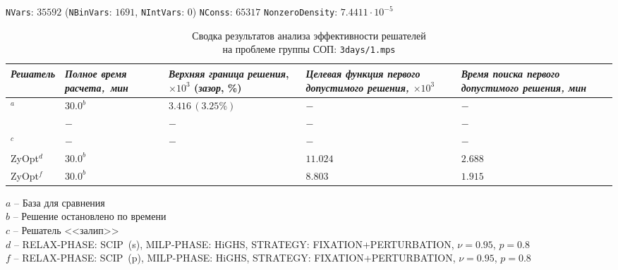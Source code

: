 \documentclass[%
	11pt,
	a4paper,
	utf8,
		]{article}
\begin{document}
\vspace*{5mm}

{
	\begin{table}[!h]
		\centering
		\caption{Сводка результатов анализа эффективности решателей\\ на проблеме группы СОП: \texttt{3days/1.mps}} 
		
		{\footnotesize \texttt{NVars}: $ 35592 $ (\texttt{NBinVars}: $ 1691 $,  \texttt{NIntVars}: $ 0 $) \texttt{NConss}: $ 65317 $ \texttt{NonzeroDensity}: $  7.4411 \cdot 10^{-5} $}\\[2mm]
		
		\begin{tabular}{ p{2.9cm} | p{2.5cm} p{3.6cm} p{3.75cm} p{3.6cm} p{3.2cm} }
			\rowcolor{black!5}\emph{Решатель} & \emph{Полное время \mbox{расчета, мин}} & \emph{Верхняя граница} \mbox{\itshape решения}, $ \times 10^{3} $ (\emph{зазор}, \%) & \emph{Целевая функция первого допустимого решения, $ \times 10^3 $} & \emph{Время поиска первого допустимого решения, мин} \\
			\hline
			\rowcolor{blue!3}{CPLEX 12.8.0.0}$ ^a $ & $ 30.0^b $ & $ 3.416 \, (3.25\%) $ & $ - $ & $ - $ \\
			\rowcolor{black!5}{SCIP 8.0.3} & $ - $ & $ - $ & $ - $ & $ - $ \\
			\rowcolor{blue!3}{HiGHS 1.5.3}$ ^c $ & $ - $ & $ - $ & $ - $ & $ - $ \\
			\rowcolor{black!5}ZyOpt$^d $ & {$ 30.0^b $}  & \ccb{$ 3.583 \, (8.52\%) (-4.9\%) $} & $ 11.024 $ & $ 2.688 $ \\
			\rowcolor{blue!3}ZyOpt$^f $ & {$ 30.0^b $}  & \ccb{$ 4.353 \, (3.83\%) (-27.4\%) $} & $ 8.803 $ & $ 1.915 $ 
		\end{tabular}
	\end{table}
	\vspace*{-3mm}
	\hspace*{3mm}$ a $ -- {\footnotesize База для сравнения}\\[-7mm]
	
	\hspace*{3mm}$ b $ -- {\footnotesize Решение остановлено по времени}\\[-7mm]
	
	\hspace*{3mm}$ c $ -- {\footnotesize Решатель <<залип>>}\\[-7mm]
	
	\hspace*{3mm}$ d $ -- {\footnotesize RELAX-PHASE: SCIP~(s), MILP-PHASE: HiGHS, STRATEGY: FIXATION+PERTURBATION, $ \nu = 0.95 $, $ p = 0.8 $}\\[-7mm]
	
	\hspace*{3mm}$ f $ -- {\footnotesize RELAX-PHASE: SCIP~(p), MILP-PHASE: HiGHS, STRATEGY: FIXATION+PERTURBATION, $ \nu = 0.95 $, $ p = 0.8 $}\\[-7mm]
}
\end{document}
